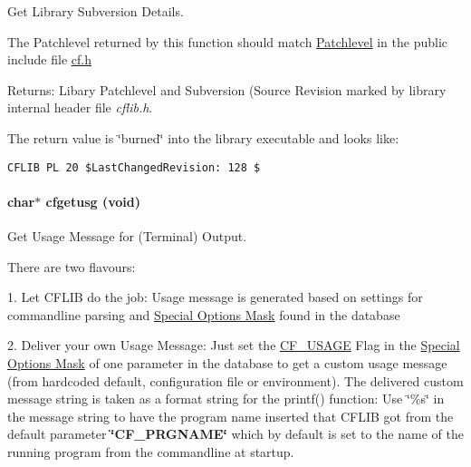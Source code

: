 Get Library Subversion Details. 

The Patchlevel returned by this function should match \hyperlink{group__cflib__core_g0beb5d41f2b506f1c969c56731bb9490}{Patchlevel} in the public include file \hyperlink{cf_8h}{cf.h}

\begin{Desc}
\item[Returns:]Libary Patchlevel and Subversion (Source Revision marked by library internal header file {\em cflib.h\/}.\end{Desc}
The return value is \char`\"{}burned\char`\"{} into the library executable and looks like: 

\footnotesize\begin{verbatim}CFLIB PL 20 $LastChangedRevision: 128 $ \end{verbatim}
\normalsize
 \hypertarget{group__retrieval_ge272c1881db940e56c8cc364df730271}{
\paragraph[{cfgetusg}]{\setlength{\rightskip}{0pt plus 5cm}char$\ast$ cfgetusg (void)}\hfill}
\label{group__retrieval_ge272c1881db940e56c8cc364df730271}


Get Usage Message for (Terminal) Output. 

There are two flavours:

1. Let CFLIB do the job: Usage message is generated based on settings for commandline parsing and \hyperlink{group__special__options__mask}{Special Options Mask} found in the database

2. Deliver your own Usage Message: Just set the \hyperlink{group__special__options__mask_gc30981201d7455071cef38a0133b9228}{CF\_\-USAGE} Flag in the \hyperlink{group__special__options__mask}{Special Options Mask} of one parameter in the database to get a custom usage message (from hardcoded default, configuration file or environment). The delivered custom message string is taken as a format string for the printf() function: Use \char`\"{}\%s\char`\"{} in the message string to have the program name inserted that CFLIB got from the default parameter {\bf \char`\"{}CF\_\-PRGNAME\char`\"{}} which by default is set to the name of the running program from the commandline at startup.

